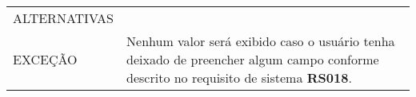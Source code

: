 \begin{longtable}[c]{@{}|p{4cm}|p{9cm}|@{}}
\begin{minipage}[t]{0.47\columnwidth}
\end{minipage}
\\\hline
\begin{minipage}[t]{0.47\columnwidth}
ALTERNATIVAS
\end{minipage} & \begin{minipage}[t]{0.47\columnwidth}
\end{minipage}
\\\hline
\begin{minipage}[t]{0.47\columnwidth}
EXCEÇÃO
\end{minipage} & \begin{minipage}[t]{0.47\columnwidth}
Nenhum valor será exibido caso o usuário tenha deixado de preencher
algum campo conforme descrito no requisito de sistema \textbf{RS018}.
\end{minipage}
\\\hline

\end{longtable}

 

